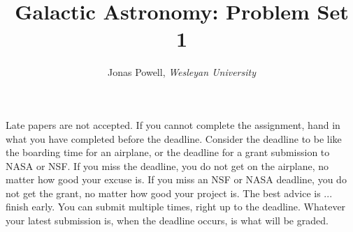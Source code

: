 \documentclass[12pt]{article}
\begin{document}



\title{\Large \textbf{Galactic Astronomy: Problem Set 1}}

\author{
{\rm Jonas Powell, \textit{Wesleyan University}}\\
}


\maketitle


\begin{addmargin}[4em]{4em}
 Late papers are not accepted. If you cannot complete the assignment, hand in what you have completed before the deadline. Consider the deadline to be like the boarding time for an airplane, or the deadline for a grant submission to NASA or NSF. If you miss the deadline, you do not get on the airplane, no matter how good your excuse is. If you miss an NSF or NASA deadline, you do not get the grant, no matter how good your project is. The best advice is ... finish early. You can submit multiple times, right up to the deadline. Whatever your latest submission is, when the deadline occurs, is what will be graded.
\bigskip \bigskip
\end{addmargin}

 
\end{document}
